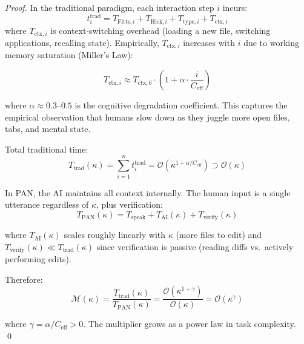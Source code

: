 \documentclass[11pt, a4paper]{article}
\begin{document}
\begin{proof}
In the traditional paradigm, each interaction step $i$ incurs:
\begin{equation}
  t_i^{\text{trad}} = T_{\text{Fitts},i} + T_{\text{Hick},i} + T_{\text{type},i} + T_{\text{ctx},i}
\end{equation}
where $T_{\text{ctx},i}$ is context-switching overhead (loading a new file,
switching applications, recalling state). Empirically, $T_{\text{ctx},i}$
increases with $i$ due to working memory saturation (Miller's Law):

\begin{equation}
  T_{\text{ctx},i} \approx T_{\text{ctx},0} \cdot \left(1 + \alpha \cdot \frac{i}{C_{\text{eff}}}\right)
  \label{eq:ctx_growth}
\end{equation}

where $\alpha \approx 0.3\text{--}0.5$ is the cognitive degradation
coefficient. This captures the empirical observation that humans slow down
as they juggle more open files, tabs, and mental state.

Total traditional time:
\begin{equation}
  T_{\text{trad}}(\kappa) = \sum_{i=1}^{\kappa} t_i^{\text{trad}} = \mathcal{O}\!\left(\kappa^{1+\alpha/C_{\text{eff}}}\right) \supset \mathcal{O}(\kappa)
\end{equation}

In PAN, the AI maintains all context internally. The human input is a single
utterance regardless of $\kappa$, plus verification:
\begin{equation}
  T_{\text{PAN}}(\kappa) = T_{\text{speak}} + T_{\text{AI}}(\kappa) + T_{\text{verify}}(\kappa)
\end{equation}

where $T_{\text{AI}}(\kappa)$ scales roughly linearly with $\kappa$ (more files
to edit) and $T_{\text{verify}}(\kappa) \ll T_{\text{trad}}(\kappa)$ since
verification is passive (reading diffs vs.\ actively performing edits).

Therefore:
\begin{equation}
  \mathcal{M}(\kappa) = \frac{T_{\text{trad}}(\kappa)}{T_{\text{PAN}}(\kappa)} = \frac{\mathcal{O}(\kappa^{1+\gamma})}{\mathcal{O}(\kappa)} = \mathcal{O}(\kappa^{\gamma})
  \label{eq:superlinear}
\end{equation}

where $\gamma = \alpha / C_{\text{eff}} > 0$. The multiplier grows as a power
law in task complexity. \qed
\end{proof}
\end{document}
